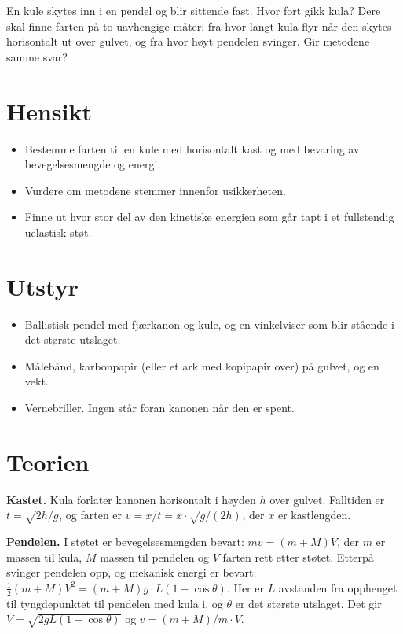 \documentclass[11pt]{article}
\begin{document}

En kule skytes inn i en pendel og blir sittende fast. Hvor fort gikk kula? Dere skal finne farten på to uavhengige måter: fra hvor langt kula flyr når den skytes horisontalt ut over gulvet, og fra hvor høyt pendelen svinger. Gir metodene samme svar?

\section*{Hensikt}

\begin{itemize}
\item Bestemme farten til en kule med horisontalt kast og med bevaring av bevegelsesmengde og energi.
\item Vurdere om metodene stemmer innenfor usikkerheten.
\item Finne ut hvor stor del av den kinetiske energien som går tapt i et fullstendig uelastisk støt.
\end{itemize}

\section*{Utstyr}

\begin{itemize}
\item Ballistisk pendel med fjærkanon og kule, og en vinkelviser som blir stående i det største utslaget.
\item Målebånd, karbonpapir (eller et ark med kopipapir over) på gulvet, og en vekt.
\item Vernebriller. Ingen står foran kanonen når den er spent.
\end{itemize}

\section*{Teorien}

\textbf{Kastet.} Kula forlater kanonen horisontalt i høyden $h$ over gulvet. Falltiden er $t = \sqrt{2h/g}$, og farten er $v = x/t = x \cdot \sqrt{g/(2h)}$, der $x$ er kastlengden.

\textbf{Pendelen.} I støtet er bevegelsesmengden bevart: $mv = (m + M)V$, der $m$ er massen til kula, $M$ massen til pendelen og $V$ farten rett etter støtet. Etterpå svinger pendelen opp, og mekanisk energi er bevart: $\tfrac{1}{2}(m + M)V^{2} = (m + M)g \cdot L(1 - \cos θ)$. Her er $L$ avstanden fra opphenget til tyngdepunktet til pendelen med kula i, og $θ$ er det største utslaget. Det gir $V = \sqrt{2gL(1 - \cos  θ)}$ og $v = (m + M)/m \cdot V$.
\end{document}
